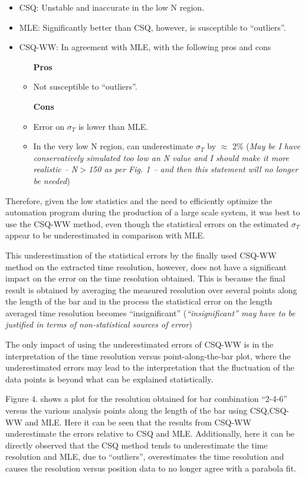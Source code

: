 \documentclass[12pt]{article}
\begin{document}
\begin{itemize}
	\item CSQ: Unstable and inaccurate in the low N region. 
	\item MLE: Significantly better than CSQ, however, is susceptible to ``outliers''.
	\item CSQ-WW: In agreement with MLE, with the following pros and cons
		\begin{itemize}
			\item [\textbf{Pros}]
			\item Not susceptible to ``outliers''.
		\end{itemize}
		\begin{itemize}
			\item [\textbf{Cons}]
			\item Error on $\sigma_{T}$ is lower than MLE.
			\item In the very low N region, can underestimate $\sigma_{T}$ by $\approx$ 2\% (\textit{May be I have conservatively simulated too low an N value and I should make it more realistic -- N$>$150 as per Fig. 1 -- and then this statement will no longer be needed})
		\end{itemize}
\end{itemize}

Therefore, given the low statistics and the need to efficiently optimize the automation program during the production of a large scale system, it was best to use the CSQ-WW method, even though the statistical errors on the estimated $\sigma_{T}$ appear to be underestimated in comparison with MLE.

This underestimation of the statistical errors by the finally used CSQ-WW method on the extracted time resolution, however, does not have a significant impact on the error on the time resolution obtained. This is because the final result is obtained by averaging the measured resolution over several points along the length of the bar and in the process the statistical error on the length averaged time resolution becomes ``insignificant'' (\textit{``insignificant'' may have to be justified in terms of non-statistical sources of error})

The only impact of using the underestimated errors of CSQ-WW is in the interpretation of the time resolution versus point-along-the-bar plot, where the underestimated errors may lead to the interpretation that the fluctuation of the data points is beyond what can be explained statistically. 

Figure 4. shows a plot for the resolution obtained for bar combination ``2-4-6'' versus the various analysis points along the length of the bar using CSQ,CSQ-WW and MLE. Here it can be seen that the results from CSQ-WW underestimate the errors relative to CSQ and MLE. Additionally, here it can be directly observed that the CSQ method tends to underestimate the time resolution and MLE, due to ``outliers'', overestimates the time resolution and causes the resolution versus position data to no longer agree with a parabola fit.  
\end{document}
